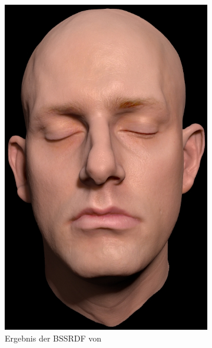 \documentclass[ngerman,runningheads,a4paper]{llncs}[2018/03/10]
\begin{document}
\begin{figure}
  \centering
  \begin{subfigure}{.5\textwidth}
    \centering
    \includegraphics[scale=0.2,keepaspectratio]{./images/bssrdf-head.jpg}
    \caption{Ergebnis der BSSRDF von \citet{spectral-bssrdf-human-skin}}
    \label{fig:outlook-bssrdf}
  \end{subfigure}%
  \begin{subfigure}{.5\textwidth}
    \centering

\end{subfigure}
\end{figure}
\end{document}
